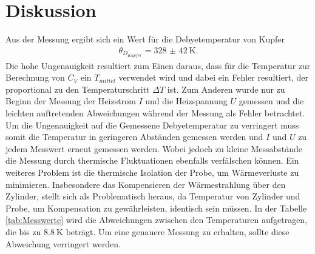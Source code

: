 \section{Diskussion}
\label{sec:Diskussion}

Aus der Messung ergibt sich ein Wert für die Debyetemperatur von Kupfer
\begin{align}
\theta_{D_{Kupfer}} = \SI{328(42)}{\kelvin}.
\end{align}
Die hohe Ungenauigkeit resultiert zum Einen daraus, dass für die Temperatur zur Berechnung von
$C_V$ ein $T_{mittel}$ verwendet wird und dabei ein Fehler resultiert, der proportional
zu den Temperaturschritt $\Delta T$ ist. Zum Anderen wurde
nur zu Beginn der Messung der Heizstrom $I$ und die Heizspannung $U$
gemessen und die leichten auftretenden Abweichungen während der Messung als Fehler betrachtet.
Um die Ungenauigkeit auf die Gemessene Debyetemperatur zu verringert muss somit die
Temperatur in geringeren Abständen gemessen werden und $I$ und $U$ zu jedem
Messwert erneut gemessen werden. Wobei jedoch zu kleine
Messabstände die Messung durch thermische Fluktuationen ebenfalls verfälschen können.
Ein weiteres Problem ist die thermische Isolation der Probe, um Wärmeverluste zu minimieren. Insbesondere das Kompensieren der Wärmestrahlung über
den Zylinder, stellt sich als Problematisch heraus, da Temperatur von Zylinder und Probe, um Kompensation zu gewährleisten, identisch sein müssen.
In der Tabelle \ref{tab:Messwerte} wird die Abweichungen zwischen den Temperaturen aufgetragen, die bis zu $\SI{8.8}{\kelvin}$
beträgt. Um eine genauere Messung zu erhalten, sollte diese Abweichung verringert werden.

